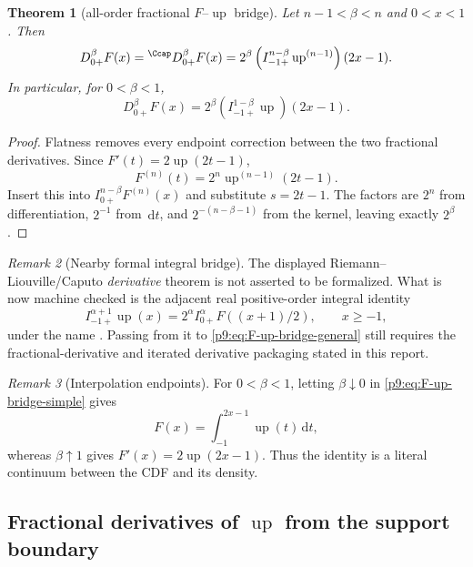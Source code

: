 \documentclass[11pt,oneside]{article}
\newtheorem{theorem}{Theorem}[section]
\theoremstyle{definition}
\theoremstyle{remark}
\newtheorem{remark}[theorem]{Remark}
\newcommand{\Up}{\operatorname{up}}
\newcommand{\dd}{\,\mathrm d}
\newcommand{\1}{\mathbf 1}
\begin{document}
\begin{theorem}[all-order fractional $F$--$\Up$ bridge]
\label{p9:thm:F-up-bridge}
Let $n-1<\beta<n$ and $0<x<1$.  Then
\begin{equation}
 D_{0+}^\beta F(x)
 ={}^{\Ccap}D_{0+}^\beta F(x)
 =2^\beta
   \left(I_{-1+}^{n-\beta}\Up^{(n-1)}\right)(2x-1).
 \label{p9:eq:F-up-bridge-general}
\end{equation}
In particular, for $0<\beta<1$,
\begin{equation}
 D_{0+}^\beta F(x)
 =2^\beta\left(I_{-1+}^{1-\beta}\Up\right)(2x-1).
 \label{p9:eq:F-up-bridge-simple}
\end{equation}
\end{theorem}

\begin{proof}
Flatness removes every endpoint correction between the two fractional
derivatives.  Since $F'(t)=2\Up(2t-1)$,
\begin{equation}
 F^{(n)}(t)=2^n\Up^{(n-1)}(2t-1).
\end{equation}
Insert this into
$I_{0+}^{n-\beta}F^{(n)}(x)$ and substitute $s=2t-1$.  The factors are
$2^n$ from differentiation, $2^{-1}$ from $\dd t$, and
$2^{-(n-\beta-1)}$ from the kernel, leaving exactly $2^\beta$.
\end{proof}

\begin{remark}[Nearby formal integral bridge]
The displayed Riemann--Liouville/Caputo \emph{derivative} theorem is not asserted to be
formalized.  What is now machine checked is the adjacent real positive-order integral
identity
\[
 I_{-1+}^{\alpha+1}\Up(x)
 =2^\alpha I_{0+}^{\alpha}F((x+1)/2),\qquad x\ge-1,
\]
under the name .  Passing from it to
\eqref{p9:eq:F-up-bridge-general} still requires the fractional-derivative and iterated
derivative packaging stated in this report.
\end{remark}

\begin{remark}[Interpolation endpoints]
For $0<\beta<1$, letting $\beta\downarrow0$ in
\cref{p9:eq:F-up-bridge-simple} gives
\[
 F(x)=\int_{-1}^{2x-1}\Up(t)\dd t,
\]
whereas $\beta\uparrow1$ gives $F'(x)=2\Up(2x-1)$.  Thus the identity is a
literal continuum between the CDF and its density.
\end{remark}

\subsection{Fractional derivatives of \texorpdfstring{$\Up$}{up} from the support boundary}
\end{document}
